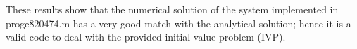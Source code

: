 \documentclass{article}
\begin{document}
{\begin{figure}[!ht]
\end{figure}
\par \medskip
\par \bigskip \par
\par \bigskip \par
\par \bigskip \par
\par \bigskip \par
\par \bigskip \par
\par \bigskip \par
\par \bigskip \par
\par \bigskip \par
\par \bigskip \par
\par \bigskip \par
\par \bigskip \par
\par \bigskip \par
\par \bigskip \par
\par \bigskip \par
\par \bigskip \par
\par \bigskip \par
\par \bigskip \par
\par \bigskip \par
\par \bigskip \par
\par \bigskip \par
\par \bigskip \par
\par \bigskip \par
These results show that the numerical solution of the system implemented in proge820474.m has a very good match with the analytical solution; hence it is a valid code to deal with the provided initial value problem (IVP). 
\par \medskip \par
}
\end{document}
